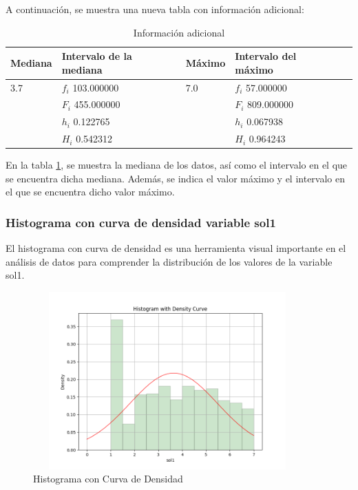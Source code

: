 A continuación, se muestra una nueva tabla con información adicional:

\begin{table}[H]
    \centering
    \caption{Información adicional}
    \begin{tabular}{lllll}
        \hline
        \textbf{Mediana} & \textbf{Intervalo de la mediana} & \textbf{Máximo} & \textbf{Intervalo del máximo} \\
        \hline
        3.7              & $f_i$ 103.000000                 & 7.0             & $f_i$ 57.000000               \\
                         & $F_i$ 455.000000                 &                 & $F_i$ 809.000000              \\
                         & $h_i$ 0.122765                   &                 & $h_i$ 0.067938                \\
                         & $H_i$ 0.542312                   &                 & $H_i$ 0.964243                \\
        \hline
    \end{tabular}%
    \label{tab:informacion_adicional}%
\end{table}%

En la tabla \ref{tab:informacion_adicional}, se muestra la mediana de los datos, así como el intervalo en el que se encuentra dicha mediana. Además, se indica el valor máximo y el intervalo en el que se encuentra dicho valor máximo.

\subsubsection{Histograma con curva de densidad variable sol1}

El histograma con curva de densidad es una herramienta visual importante en el análisis de datos para comprender la distribución de los valores de la variable sol1.

\begin{figure}[H]
    \centering
    \includegraphics[width=4.06111in,height=2.68611in]{img/histogramaConCurvaDeDensidad.png}
    \caption{Histograma con Curva de Densidad}
    \label{fig:hist_density}%
\end{figure}%


